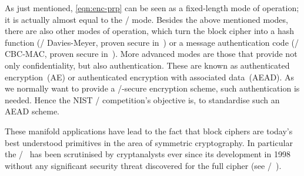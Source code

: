 As just mentioned, \cref{eqn:enc-prp} can be seen as a fixed-length mode of operation; it is actually almost equal to the \CTR/ mode.
Besides the above mentioned modes, there are also other modes of operation, which turn the block cipher into a hash function (\eg/ Davies-Meyer, proven secure in~\cite{C:BlaRogShr02}) or a message authentication code (\eg/ CBC-MAC, proven secure in~\cite{C:BelKilRog94}).
More advanced modes are those that provide not only confidentiality, but also authentication.
These are known as authenticated encryption~(AE) or authenticated encryption with associated data~(AEAD).
As we normally want to provide a \CCA/-secure encryption scheme, such authentication is needed.
Hence the NIST \LWC/ competition's objective is, to standardise such an AEAD scheme.

These manifold applications have lead to the fact that block ciphers are today's best understood primitives in the area of symmetric cryptography.
In particular the \AES/~\cite{FIPS:AES} has been scrutinised by cryptanalysts ever since its development in 1998~\cite{CARDIS:DaeRij98} without any significant security threat discovered for the full cipher (see \eg/~).

